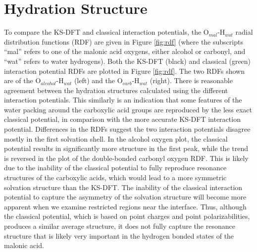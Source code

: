 \section {Hydration Structure}

To compare the KS-DFT and classical interaction potentials, the O$_{mal}$-H$_{wat}$ radial distribution functions (RDF) are given in Figure \ref{fig:rdf} (where the subscripts ``mal'' refers to one of the malonic acid oxygens, either alcohol or carbonyl, and ``wat'' refers to water hydrogens). Both the KS-DFT (black) and classical (green) interaction potential RDFs are plotted in Figure \ref{fig:rdf}. The two RDFs shown are of the O$_{alcohol}$-H$_{wat}$ (left) and the O$_{carb}$-H$_{wat}$ (right). There is reasonable agreement between the hydration structures calculated using the different interaction potentials. This similarly is an indication that some features of the water packing around the carboxylic acid groups are reproduced by the less exact classical potential, in comparison with the more accurate KS-DFT interaction potential. Differences in the RDFs suggest the two interaction potentials disagree mostly in the first solvation shell. In the alcohol oxygen plot, the classical potential results in significantly more structure in the first peak, while the trend is reversed in the plot of the double-bonded carbonyl oxygen RDF. This is likely due to the inability of the classical potential to fully reproduce resonance structures of the carboxylic acids, which would lead to a more symmetric solvation structure than the KS-DFT. The inability of the classical interaction potential to capture the asymmetry of the solvation structure will become more apparent when we examine restricted regions near the interface. Thus, although the classical potential, which is based on point charges and point polarizabilities, produces a similar average structure, it does not fully capture the resonance structure that is likely very important in the hydrogen bonded states of the malonic acid.

